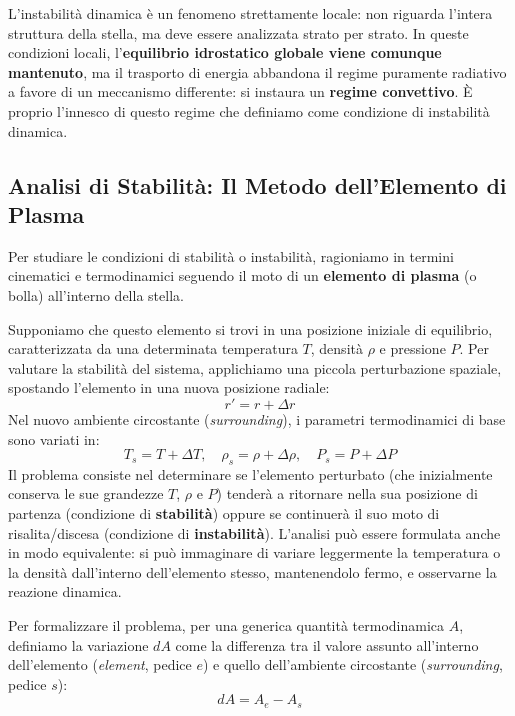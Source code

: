 L'instabilità dinamica è un fenomeno strettamente locale: non riguarda l'intera struttura della stella, ma deve essere analizzata strato per strato. In queste condizioni locali, l'\textbf{equilibrio idrostatico globale viene comunque mantenuto}, ma il trasporto di energia abbandona il regime puramente radiativo a favore di un meccanismo differente: si instaura un \textbf{regime convettivo}. È proprio l'innesco di questo regime che definiamo come condizione di instabilità dinamica.

\subsection{Analisi di Stabilità: Il Metodo dell'Elemento di Plasma}

Per studiare le condizioni di stabilità o instabilità, ragioniamo in termini cinematici e termodinamici seguendo il moto di un \textbf{elemento di plasma} (o bolla) all'interno della stella.

Supponiamo che questo elemento si trovi in una posizione iniziale di equilibrio, caratterizzata da una determinata temperatura $T$, densità $\rho$ e pressione $P$. Per valutare la stabilità del sistema, applichiamo una piccola perturbazione spaziale, spostando l'elemento in una nuova posizione radiale:
\begin{equation}
r' = r + \Delta r
\end{equation}
Nel nuovo ambiente circostante (\textit{surrounding}), i parametri termodinamici di base sono variati in:
\begin{equation}
T_s = T + \Delta T, \quad \rho_s = \rho + \Delta \rho, \quad P_s = P + \Delta P
\end{equation}
Il problema consiste nel determinare se l'elemento perturbato (che inizialmente conserva le sue grandezze $T$, $\rho$ e $P$) tenderà a ritornare nella sua posizione di partenza (condizione di \textbf{stabilità}) oppure se continuerà il suo moto di risalita/discesa (condizione di \textbf{instabilità}). L'analisi può essere formulata anche in modo equivalente: si può immaginare di variare leggermente la temperatura o la densità dall'interno dell'elemento stesso, mantenendolo fermo, e osservarne la reazione dinamica.

Per formalizzare il problema, per una generica quantità termodinamica $A$, definiamo la variazione $dA$ come la differenza tra il valore assunto all'interno dell'elemento (\textit{element}, pedice $e$) e quello dell'ambiente circostante (\textit{surrounding}, pedice $s$):
\begin{equation}
dA = A_e - A_s
\end{equation}

